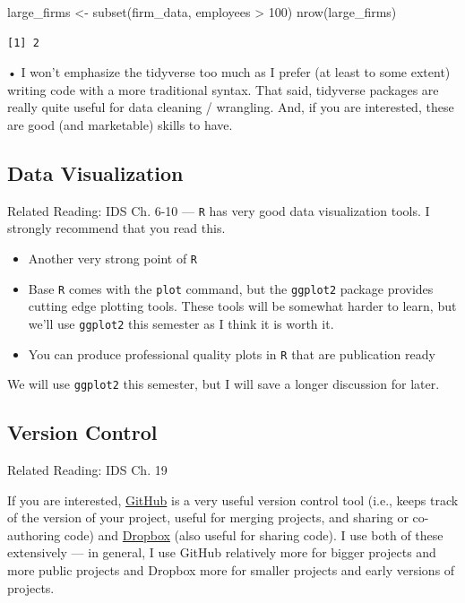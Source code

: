 \documentclass[
  letterpaper,
  DIV=11,
  numbers=noendperiod]{scrreprt}
\newenvironment{Shaded}{\begin{snugshade}}{\end{snugshade}}
\newcommand{\DecValTok}[1]{\textcolor[rgb]{0.68,0.00,0.00}{#1}}
\newcommand{\FunctionTok}[1]{\textcolor[rgb]{0.28,0.35,0.67}{#1}}
\newcommand{\NormalTok}[1]{\textcolor[rgb]{0.00,0.23,0.31}{#1}}
\newcommand{\OtherTok}[1]{\textcolor[rgb]{0.00,0.23,0.31}{#1}}
\newcommand{\SpecialCharTok}[1]{\textcolor[rgb]{0.37,0.37,0.37}{#1}}
\begin{document}
\begin{Shaded}
\begin{Highlighting}[]
\NormalTok{large\_firms }\OtherTok{\textless{}{-}} \FunctionTok{subset}\NormalTok{(firm\_data, employees }\SpecialCharTok{\textgreater{}} \DecValTok{100}\NormalTok{)}
\FunctionTok{nrow}\NormalTok{(large\_firms)}
\end{Highlighting}
\end{Shaded}

\begin{verbatim}
[1] 2
\end{verbatim}

• I won't emphasize the tidyverse too much as I prefer (at least to some
extent) writing code with a more traditional syntax. That said,
tidyverse packages are really quite useful for data cleaning /
wrangling. And, if you are interested, these are good (and marketable)
skills to have.

\subsection{Data Visualization}\label{data-visualization}

Related Reading: IDS Ch. 6-10 --- \texttt{R} has very good data
visualization tools. I strongly recommend that you read this.

\begin{itemize}
\item
  Another very strong point of \texttt{R}
\item
  Base \texttt{R} comes with the \texttt{plot} command, but the
  \texttt{ggplot2} package provides cutting edge plotting tools. These
  tools will be somewhat harder to learn, but we'll use \texttt{ggplot2}
  this semester as I think it is worth it.
\item
  You can produce professional quality plots in \texttt{R} that are
  publication ready
\end{itemize}

We will use \texttt{ggplot2} this semester, but I will save a longer
discussion for later.

\subsection{Version Control}\label{version-control}

Related Reading: IDS Ch. 19

If you are interested, \href{http://github.com}{GitHub} is a very useful
version control tool (i.e., keeps track of the version of your project,
useful for merging projects, and sharing or co-authoring code) and
\href{http://dropbox.com}{Dropbox} (also useful for sharing code). I use
both of these extensively --- in general, I use GitHub relatively more
for bigger projects and more public projects and Dropbox more for
smaller projects and early versions of projects.
\end{document}

